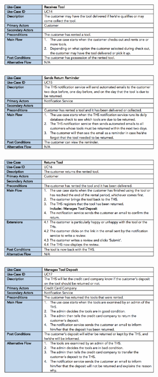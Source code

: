 \begin{figure}[H]
      \centering
      \includegraphics[trim = 0 0 0 0, clip, width=0.7\textwidth]{TempImg/UC14.png}
 \end{figure}

\begin{figure}[H]
      \centering
      \includegraphics[trim = 0 0 0 0, clip, width=0.7\textwidth]{TempImg/UC15.png}
 \end{figure}

\begin{figure}[H]
      \centering
      \includegraphics[trim = 0 0 0 0, clip, width=0.7\textwidth]{TempImg/UC16.png}
 \end{figure}

\begin{figure}[H]
      \centering
      \includegraphics[trim = 0 0 0 0, clip, width=0.7\textwidth]{TempImg/UC17.png}
 \end{figure}


